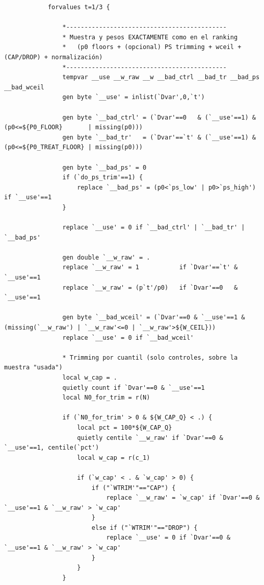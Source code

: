 \documentclass[12pt]{article}
\begin{document}
\begin{lstlisting}
            forvalues t=1/3 {

                *--------------------------------------------
                * Muestra y pesos EXACTAMENTE como en el ranking
                *   (p0 floors + (opcional) PS trimming + wceil + (CAP/DROP) + normalización)
                *--------------------------------------------
                tempvar __use __w_raw __w __bad_ctrl __bad_tr __bad_ps __bad_wceil
                gen byte `__use' = inlist(`Dvar',0,`t')

                gen byte `__bad_ctrl' = (`Dvar'==0   & (`__use'==1) & (p0<=${P0_FLOOR}       | missing(p0)))
                gen byte `__bad_tr'   = (`Dvar'==`t' & (`__use'==1) & (p0<=${P0_TREAT_FLOOR} | missing(p0)))

                gen byte `__bad_ps' = 0
                if (`do_ps_trim'==1) {
                    replace `__bad_ps' = (p0<`ps_low' | p0>`ps_high') if `__use'==1
                }

                replace `__use' = 0 if `__bad_ctrl' | `__bad_tr' | `__bad_ps'

                gen double `__w_raw' = .
                replace `__w_raw' = 1           if `Dvar'==`t' & `__use'==1
                replace `__w_raw' = (p`t'/p0)   if `Dvar'==0   & `__use'==1

                gen byte `__bad_wceil' = (`Dvar'==0 & `__use'==1 & (missing(`__w_raw') | `__w_raw'<=0 | `__w_raw'>${W_CEIL}))
                replace `__use' = 0 if `__bad_wceil'

                * Trimming por cuantil (solo controles, sobre la muestra "usada")
                local w_cap = .
                quietly count if `Dvar'==0 & `__use'==1
                local N0_for_trim = r(N)

                if (`N0_for_trim' > 0 & ${W_CAP_Q} < .) {
                    local pct = 100*${W_CAP_Q}
                    quietly centile `__w_raw' if `Dvar'==0 & `__use'==1, centile(`pct')
                    local w_cap = r(c_1)

                    if (`w_cap' < . & `w_cap' > 0) {
                        if ("`WTRIM'"=="CAP") {
                            replace `__w_raw' = `w_cap' if `Dvar'==0 & `__use'==1 & `__w_raw' > `w_cap'
                        }
                        else if ("`WTRIM'"=="DROP") {
                            replace `__use' = 0 if `Dvar'==0 & `__use'==1 & `__w_raw' > `w_cap'
                        }
                    }
                }


\end{lstlisting}
\end{document}
